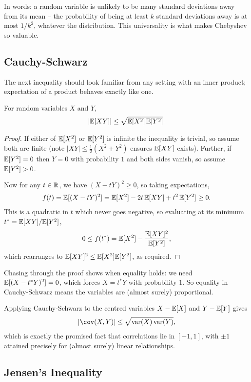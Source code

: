\documentclass[a4paper]{scrartcl}
\begin{document}
In words: a random variable is unlikely to be many standard deviations away from its mean -- the probability of being at least $k$ standard deviations away is at most $1/k^2$, whatever the distribution. This universality is what makes Chebyshev so valuable.

\subsection{Cauchy-Schwarz}

The next inequality should look familiar from any setting with an inner product; expectation of a product behaves exactly like one.

\begin{theorem}
	For random variables $X$ and $Y$,
	$$
	\left|\mathbb{E}[XY]\right| \leq \sqrt{\mathbb{E}[X^2]\,\mathbb{E}[Y^2]}.
	$$
\end{theorem}
\begin{proof}
	If either of $\mathbb{E}[X^2]$ or $\mathbb{E}[Y^2]$ is infinite the inequality is trivial, so assume both are finite (note $|XY| \leq \frac{1}{2}(X^2 + Y^2)$ ensures $\mathbb{E}[XY]$ exists). Further, if $\mathbb{E}[Y^2] = 0$ then $Y = 0$ with probability $1$ and both sides vanish, so assume $\mathbb{E}[Y^2] > 0$.

	Now for any $t \in \mathbb{R}$, we have $(X - tY)^2 \geq 0$, so taking expectations,
	$$
	f(t) = \mathbb{E}[(X - tY)^2] = \mathbb{E}[X^2] - 2t\,\mathbb{E}[XY] + t^2\,\mathbb{E}[Y^2] \geq 0.
	$$
	This is a quadratic in $t$ which never goes negative, so evaluating at its minimum $t^* = \mathbb{E}[XY]/\mathbb{E}[Y^2]$,
	$$
	0 \leq f(t^*) = \mathbb{E}[X^2] - \frac{\mathbb{E}[XY]^2}{\mathbb{E}[Y^2]},
	$$
	which rearranges to $\mathbb{E}[XY]^2 \leq \mathbb{E}[X^2]\mathbb{E}[Y^2]$, as required.
\end{proof}

\begin{remark}
	Chasing through the proof shows when equality holds: we need $\mathbb{E}[(X - t^* Y)^2] = 0$, which forces $X = t^* Y$ with probability $1$. So equality in Cauchy-Schwarz means the variables are (almost surely) proportional.
\end{remark}

Applying Cauchy-Schwarz to the centred variables $X - \mathbb{E}[X]$ and $Y - \mathbb{E}[Y]$ gives
$$
|\cov(X, Y)| \leq \sqrt{\var(X)\var(Y)},
$$
which is exactly the promised fact that correlations lie in $[-1, 1]$, with $\pm 1$ attained precisely for (almost surely) linear relationships.

\subsection{Jensen's Inequality}
\end{document}
